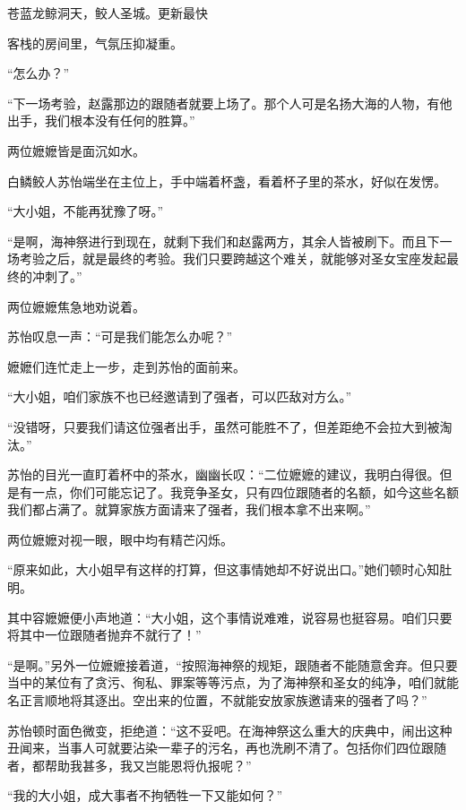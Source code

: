 
\begin{this_body}



苍蓝龙鲸洞天，鲛人圣城。更新最快

客栈的房间里，气氛压抑凝重。

“怎么办？”

“下一场考验，赵露那边的跟随者就要上场了。那个人可是名扬大海的人物，有他出手，我们根本没有任何的胜算。”

两位嬷嬷皆是面沉如水。

白鳞鲛人苏怡端坐在主位上，手中端着杯盏，看着杯子里的茶水，好似在发愣。

“大小姐，不能再犹豫了呀。”

“是啊，海神祭进行到现在，就剩下我们和赵露两方，其余人皆被刷下。而且下一场考验之后，就是最终的考验。我们只要跨越这个难关，就能够对圣女宝座发起最终的冲刺了。”

两位嬷嬷焦急地劝说着。

苏怡叹息一声：“可是我们能怎么办呢？”

嬷嬷们连忙走上一步，走到苏怡的面前来。

“大小姐，咱们家族不也已经邀请到了强者，可以匹敌对方么。”

“没错呀，只要我们请这位强者出手，虽然可能胜不了，但差距绝不会拉大到被淘汰。”

苏怡的目光一直盯着杯中的茶水，幽幽长叹：“二位嬷嬷的建议，我明白得很。但是有一点，你们可能忘记了。我竞争圣女，只有四位跟随者的名额，如今这些名额我们都占满了。就算家族方面请来了强者，我们根本拿不出来啊。”

两位嬷嬷对视一眼，眼中均有精芒闪烁。

“原来如此，大小姐早有这样的打算，但这事情她却不好说出口。”她们顿时心知肚明。

其中容嬷嬷便小声地道：“大小姐，这个事情说难难，说容易也挺容易。咱们只要将其中一位跟随者抛弃不就行了！”

“是啊。”另外一位嬷嬷接着道，“按照海神祭的规矩，跟随者不能随意舍弃。但只要当中的某位有了贪污、徇私、罪案等等污点，为了海神祭和圣女的纯净，咱们就能名正言顺地将其逐出。空出来的位置，不就能安放家族邀请来的强者了吗？”

苏怡顿时面色微变，拒绝道：“这不妥吧。在海神祭这么重大的庆典中，闹出这种丑闻来，当事人可就要沾染一辈子的污名，再也洗刷不清了。包括你们四位跟随者，都帮助我甚多，我又岂能恩将仇报呢？”

“我的大小姐，成大事者不拘牺牲一下又能如何？”


\end{this_body}
